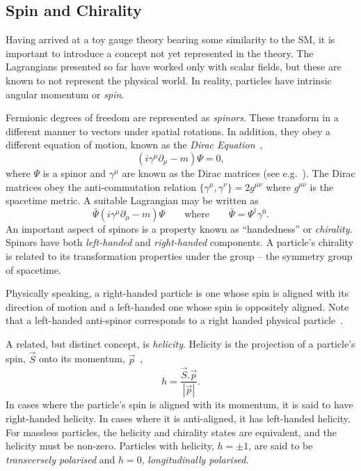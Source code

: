 \subsection{Spin and Chirality}
Having arrived at a toy gauge theory bearing some similarity to the \ac{SM}, it
is important to introduce a concept not yet represented in the theory. The
Lagrangians presented so far have worked only with scalar fields, but these are
known to not represent the physical world. In reality, particles have intrinsic
angular momentum or \emph{spin}.

Fermionic degrees of freedom are represented as \emph{spinors}. These transform
in a different manner to vectors under spatial rotations. In addition, they obey
a different equation of motion, known as the \emph{Dirac
  Equation}~\cite{peskin_schroeder},
\begin{equation*}
\left(i\gamma^\mu \partial_{\mu} - m\right)\Psi = 0,
\end{equation*}
where $\Psi$ is a spinor and $\gamma^{\mu}$ are known as the Dirac matrices (see
e.g.~\cite{aitchison}). The Dirac matrices obey the anti-commutation relation
$\{\gamma^{\mu}, \gamma^{\nu}\} = 2g^{\mu\nu}$ where $g^{\mu\nu}$ is the
spacetime metric. A suitable Lagrangian may be written as
\begin{equation*}
\bar{\Psi} \left (i\gamma^{\mu}\partial_{\mu} -m\right)\Psi \qquad \textrm{where} \qquad \bar{\Psi} =
\Psi^{\dagger}\gamma^0.
\end{equation*}
An important aspect of spinors is a property known as ``handedness'' or
\emph{chirality}. Spinors have both \emph{left-handed} and \emph{right-handed}
components. A particle's chirality is related to its transformation properties
under the \Poincare group -- the symmetry group of spacetime.

Physically speaking, a right-handed particle is one whose spin
is aligned with its direction of motion and a left-handed one whose spin is
oppositely aligned. Note that a left-handed anti-spinor corresponds to a right
handed physical particle~\cite{peskin_schroeder}.

A related, but distinct concept, is \emph{helicity}. Helicity is the projection
of a particle's spin, $\vec{S}$ onto its momentum, $\vec{p}$~\cite{peskin_schroeder},
\begin{equation*}
h = \frac{\vec{S}.\vec{p}}{\left|\vec{p}\right|}.
\end{equation*}
In cases where the particle's spin is aligned with its momentum, it is said to
have right-handed helicity. In cases where it is anti-aligned, it has
left-handed helicity. For massless particles, the helicity and chirality states
are equivalent, and the helicity must be non-zero. Particles with helicity,
$h=\pm 1$, are said to be \emph{transversely polarised} and $h=0$,
\emph{longitudinally polarised}.

